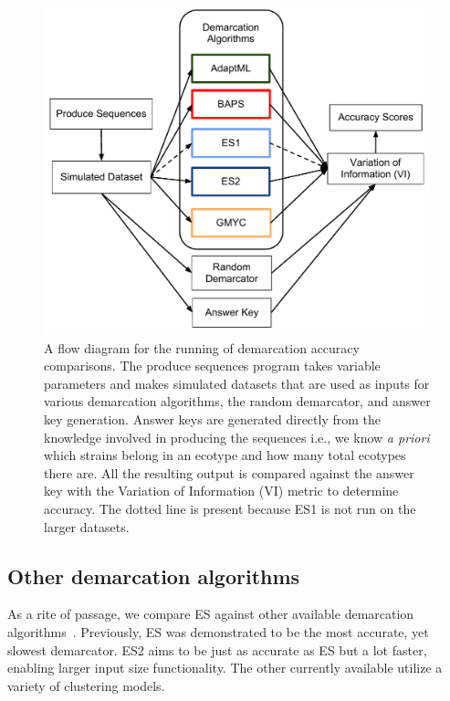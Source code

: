 \begin{figure}[h!]
\centering
\includegraphics[scale=0.75]{images/DemarcationComparisonsFlow-CH4}
\caption[Demarcation comparison flow diagram.]{A flow diagram for the running of demarcation accuracy comparisons. The produce sequences program takes variable parameters and makes simulated datasets that are used as inputs for various demarcation algorithms, the random demarcator, and answer key generation. Answer keys are generated directly from the knowledge involved in producing the sequences i.e., we know \emph{a priori} which strains belong in an ecotype and how many total ecotypes there are. All the resulting output is compared against the answer key with the Variation of Information (VI) metric to determine accuracy. The dotted line is present because ES1 is not run on the larger datasets.}
\label{fig:ComparisonFlow}
\end{figure}

\subsection*{Other demarcation algorithms}
As a rite of passage, we compare ES against other available demarcation algorithms~\cite{carlo}.
Previously, ES was demonstrated to be the most accurate, yet slowest demarcator.
ES2 aims to be just as accurate as ES but a lot faster, enabling larger input size functionality.
The other currently available utilize a variety of clustering models.

